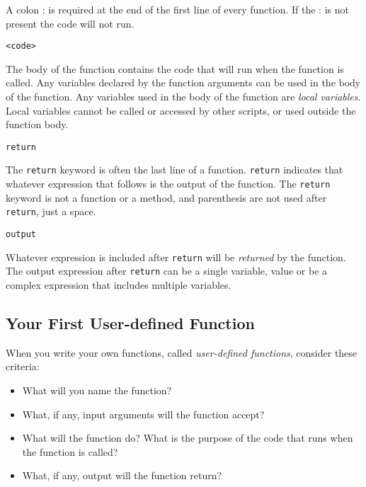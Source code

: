\documentclass{book}
\providecommand{\tightlist}{%
      \setlength{\itemsep}{0pt}\setlength{\parskip}{0pt}}
\newcommand{\passthrough}[1]{#1}
\begin{document}
A colon : is required at the end of the first line of every function. If
the : is not present the code will not run.

\begin{lstlisting}
<code>
\end{lstlisting}

The body of the function contains the code that will run when the
function is called. Any variables declared by the function arguments can
be used in the body of the function. Any variables used in the body of
the function are \emph{local variables}. Local variables cannot be
called or accessed by other scripts, or used outside the function body.

\begin{lstlisting}
return
\end{lstlisting}

The \passthrough{\lstinline!return!} keyword is often the last line of a
function. \passthrough{\lstinline!return!} indicates that whatever
expression that follows is the output of the function. The
\passthrough{\lstinline!return!} keyword is not a function or a method,
and parenthesis are not used after \passthrough{\lstinline!return!},
just a space.

\begin{lstlisting}
output
\end{lstlisting}

Whatever expression is included after \passthrough{\lstinline!return!}
will be \emph{returned} by the function. The output expression after
\passthrough{\lstinline!return!} can be a single variable, value or be a
complex expression that includes multiple variables.
    




    
        \hypertarget{your-first-user-defined-function}{%
\subsection{Your First User-defined
Function}\label{your-first-user-defined-function}}
    




    
        When you write your own functions, called \emph{user-defined functions},
consider these criteria:

\begin{itemize}
\tightlist
\item
  What will you name the function?
\item
  What, if any, input arguments will the function accept?
\item
  What will the function do? What is the purpose of the code that runs
  when the function is called?
\item
  What, if any, output will the function return?
\end{itemize}
\end{document}
